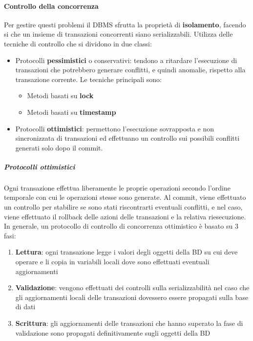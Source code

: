 \paragraph{Controllo della concorrenza}
Per gestire questi problemi il DBMS sfrutta la proprietà di \textbf{isolamento}, facendo si che un insieme di transazioni concorrenti siano serializzabili. Utilizza delle tecniche di controllo che si dividono in due classi:
\begin{itemize}
	\item Protocolli \textbf{pessimistici} o conservativi: tendono a ritardare l’esecuzione di	transazioni che potrebbero generare conflitti, e quindi anomalie, rispetto alla transazione corrente. Le tecniche principali sono:
	\begin{itemize}
		\item Metodi basati su \textbf{lock}
		\item Metodi basati su \textbf{timestamp}
	\end{itemize}
	\item Protocolli \textbf{ottimistici}: permettono l’esecuzione sovrapposta e non sincronizzata di transazioni ed effettuano un controllo sui possibili conflitti	generati solo dopo il commit. 
\end{itemize}

\subparagraph{Protocolli ottimistici}
Ogni transazione effettua liberamente le proprie operazioni secondo l’ordine temporale con cui le operazioni stesse sono generate. Al commit, viene effettuato un controllo per stabilire se sono stati riscontrarti eventuali conflitti, e nel caso, viene effettuato il rollback delle azioni delle transazioni e la relativa riesecuzione. \\
In generale, un protocollo di controllo di concorrenza ottimistico è basato su 3 fasi:
\begin{enumerate}
	\item \textbf{Lettura}: ogni transazione legge i valori degli oggetti della BD su cui deve operare e li copia in variabili locali dove sono effettuati eventuali aggiornamenti
	\item \textbf{Validazione}: vengono effettuati dei controlli sulla serializzabilità nel caso che gli aggiornamenti locali delle transazioni dovessero essere propagati sulla base di dati
	\item \textbf{Scrittura}: gli aggiornamenti delle transazioni che hanno superato la fase di validazione sono propagati definitivamente sugli oggetti della BD
\end{enumerate}

